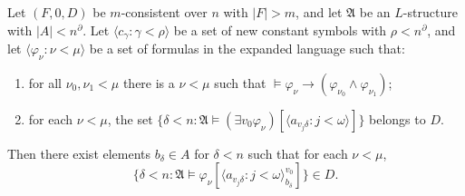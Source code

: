 Let $(F, 0, D)$ be $m$-consistent over $n$ with $|F| > m$, and let $\mathfrak{A}$ be an $L$-structure with $|A| < n^{\partial}$. Let $\langle c_\gamma : \gamma < \rho \rangle$ be a set of new constant symbols with $\rho < n^{\partial}$, and let $\langle \varphi_\nu : \nu < \mu \rangle$ be a set of formulas in the expanded language such that:

\begin{enumerate}
\item[(i)] for all $\nu_0, \nu_1 < \mu$ there is a $\nu < \mu$ such that $\models \varphi_\nu \rightarrow (\varphi_{\nu_0} \wedge \varphi_{\nu_1})$;
\item[(ii)] for each $\nu < \mu$, the set $\{\delta < n : \mathfrak{A} \models (\exists v_0 \varphi_\nu)[\langle a_{v_j \delta} : j < \omega \rangle]\}$ belongs to $D$.
\end{enumerate}

Then there exist elements $b_\delta \in A$ for $\delta < n$ such that for each $\nu < \mu$,
\[
\{\delta < n : \mathfrak{A} \models \varphi_\nu[\langle a_{v_j \delta} : j < \omega \rangle_{b_\delta}^{v_0}]\} \in D.
\]
